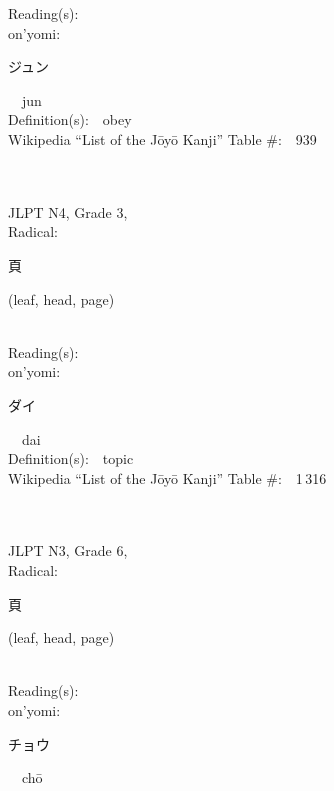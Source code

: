 \begin{multicols}{2}
Reading(s):\ \ \\
{\hspace*{1em}}on'yomi:\ \ \\
{\hspace*{2em}}{\begin{CJK}{UTF8}{min} ジュン \end{CJK}}\ \ jun\ \ \\
Definition(s):\ \ obey \\
Wikipedia ``List of the J\=oy\=o Kanji'' Table \#:\ \ 939 \\
\ \ \\
{\fontsize{34pt}{40pt}  }\ \ \\  %
{JLPT N4, Grade 3, \\Radical:\ \ {\begin{CJK}{UTF8}{min} 頁 \end{CJK}} (leaf, head, page) } \\
Reading(s):\ \ \\
{\hspace*{1em}}on'yomi:\ \ \\
{\hspace*{2em}}{\begin{CJK}{UTF8}{min} ダイ \end{CJK}}\ \ dai\ \ \\
Definition(s):\ \ topic \\
Wikipedia ``List of the J\=oy\=o Kanji'' Table \#:\ \ 1\,316 \\
\ \ \\
{\fontsize{34pt}{40pt}  }\ \ \\  %
{JLPT N3, Grade 6, \\Radical:\ \ {\begin{CJK}{UTF8}{min} 頁 \end{CJK}} (leaf, head, page) } \\
Reading(s):\ \ \\
{\hspace*{1em}}on'yomi:\ \ \\
{\hspace*{2em}}{\begin{CJK}{UTF8}{min} チョウ \end{CJK}}\ \ ch\=o\ \ \\

\end{multicols}
